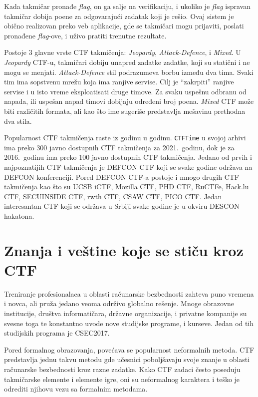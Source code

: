 \documentclass[12pt, a4paper, twocolumn]{article}
\begin{document}
Kada takmičar pronađe \emph{flag}, on ga salje na verifikaciju, i ukoliko
je \emph{flag} ispravan takmičar dobija poene za odgovarajući zadatak koji
je rešio. Ovaj sistem je obično realizovan preko veb aplikacije, gde se
takmičari mogu prijaviti, poslati pronađene \emph{flag}-ove, i uživo pratiti
trenutne rezultate.

Postoje 3 glavne vrste CTF takmičenja: \emph{Jeopardy}, \emph{Attack-Defence},
i \emph{Mixed}. \cite{ctf_time} U \emph{Jeopardy} CTF-u, takmičari dobiju 
unapred zadatke zadatke, koji su statični i ne mogu se menjati.
\emph{Attack-Defence} stil podrazumeva borbu između dva tima. Svaki tim
ima sopstvenu mrežu koja ima ranjive servise. Cilj je ``zakrpiti'' ranjive
servise i u isto vreme eksploatisati druge timove. Za svaku uspešnu odbranu 
od napada, ili uspešan napad timovi dobijaju određeni broj poena. 
\emph{Mixed} CTF može biti različitih formata, ali kao što ime sugeriše 
predstavlja mešavinu prethodna dva stila.

Popularnost CTF takmičenja raste iz godinu u godinu. \texttt{CTFTime} u
svojoj arhivi ima preko 300 javno dostupnih CTF takmičenja za 2021.\ godinu,
dok je za 2016.\ godinu ima preko 100 javno dostupnih CTF takmičenja.
\cite{ctf_time} Jedano od prvih i najpoznatijih CTF takmičenja je DEFCON CTF
koji se svake godine održava na DEFCON konferenciji. \cite{ctf_defcon} 
Pored DEFCON CTF-a postoje i mnogo drugih CTF takmičenja kao što su UCSB iCTF,
Mozilla CTF, PHD CTF, RuCTFe, Hack.lu CTF, SECUINSIDE CTF, rwth CTF, CSAW CTF,
PICO CTF. \cite{ctf_rank} Jedan interesantan CTF koji se održava u Srbiji 
svake godine je u okviru DESCON hakatona. \cite{ctf_descon}

\section{Znanja i veštine koje se stiču kroz CTF}

Treniranje profesionalaca u oblasti računarske bezbednosti zahteva puno 
vremena i novca, ali pruža jedano veoma održivo globalno rešenje. Mnoge 
obrazovne institucije, društva informatičara, državne organizacije, i privatne
kompanije su svesne toga te konstantno uvode nove studijske programe, 
i kurseve. Jedan od tih studijskih programa je CSEC2017.

Pored formalnog obrazovanja, povećava se popularnost neformalnih metoda.
CTF predstavlja jednu takvu metodu gde učesnici poboljšavaju svoje znanje u
oblasti računarske bezbednosti kroz razne zadatke. Kako CTF zadaci često 
poseduju takmičarske elemente i elemente igre, oni su neformalnog karaktera
i teško je odrediti njihovu vezu sa formalnim metodama.
\end{document}
